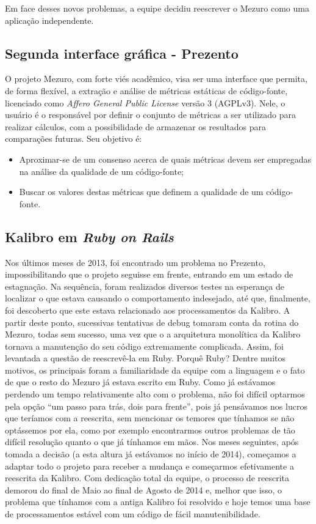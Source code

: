 \documentclass{llncs}
\begin{document}
  Em face desses novos problemas, a equipe decidiu reescrever o Mezuro como uma aplicação independente.

  \subsection{Segunda interface gráfica - Prezento}\label{sec:segundo-prototipo}

  O projeto Mezuro, com forte viés acadêmico, visa ser uma interface que permita, de forma flexível, a extração e análise de métricas estáticas de código-fonte, licenciado como \textit{Affero General Public License} versão 3 (AGPLv3). Nele, o usuário é o responsável por definir o conjunto de métricas a ser utilizado para realizar cálculos, com a possibilidade de armazenar os resultados para comparações futuras. Seu objetivo é:

  \begin{itemize}
      \item Aproximar-se de um consenso acerca de quais métricas devem ser empregadas na análise da qualidade de um código-fonte;
      \item Buscar os valores destas métricas que definem a qualidade de um código-fonte.
  \end{itemize}

  \subsection{Kalibro em \textit{Ruby on Rails}}
  Nos últimos meses de 2013, foi encontrado um problema no Prezento, impossibilitando que o projeto seguisse em frente, entrando em um estado de estagnação. Na sequência, foram realizados diversos testes na esperança de localizar o que estava causando o comportamento indesejado, até que, finalmente, foi descoberto que este estava relacionado aos processamentos da Kalibro. A partir deste ponto, sucessivas tentativas de debug tomaram conta da rotina do Mezuro, todas sem sucesso, uma vez que o a arquitetura monolítica da Kalibro tornava a manutenção do seu código extremamente complicada. Assim, foi levantada a questão de reescrevê-la em Ruby. Porquê Ruby? Dentre muitos motivos, os principais foram a familiaridade da equipe com a linguagem e o fato de que o resto do Mezuro já estava escrito em Ruby. 
  Como já estávamos perdendo um tempo relativamente alto com o problema, não foi difícil optarmos pela opção ``um passo para trás, dois para frente'', pois já pensávamos nos lucros que teríamos com a reescrita, sem mencionar os temores que tínhamos se não optássemos por ela, como por exemplo encontrarmos outros problemas de tão difícil resolução quanto o que já tínhamos em mãos. Nos meses seguintes, após tomada a decisão (a esta altura já estávamos no início de 2014), começamos a adaptar todo o projeto para receber a mudança e começarmos efetivamente a reescrita da Kalibro. 
  Com dedicação total da equipe, o processo de reescrita demorou do final de Maio ao final de Agosto de 2014 e, melhor que isso, o problema que tínhamos com a antiga Kalibro foi resolvido e hoje temos uma base de processamentos estável com um código de fácil manutenibilidade.
\end{document}
